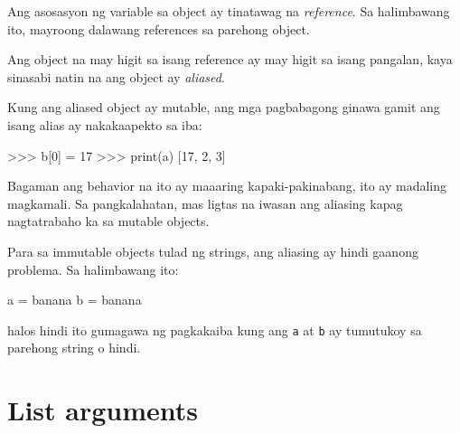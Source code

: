 \documentclass[10pt,]{book}
\newenvironment{Shaded}{}{}
\newcommand{\BuiltInTok}[1]{\textcolor[rgb]{0.00,0.50,0.00}{#1}}
\newcommand{\DecValTok}[1]{\textcolor[rgb]{0.25,0.63,0.44}{#1}}
\newcommand{\NormalTok}[1]{#1}
\newcommand{\OperatorTok}[1]{\textcolor[rgb]{0.40,0.40,0.40}{#1}}
\newcommand{\StringTok}[1]{\textcolor[rgb]{0.25,0.44,0.63}{#1}}
\begin{document}
Ang asosasyon ng variable sa object ay tinatawag na \emph{reference}. Sa
halimbawang ito, mayroong dalawang references sa parehong object.


Ang object na may higit sa isang reference ay may higit sa isang
pangalan, kaya sinasabi natin na ang object ay \emph{aliased}.


Kung ang aliased object ay mutable, ang mga pagbabagong ginawa gamit ang
isang alias ay nakakaapekto sa iba:

\begin{Shaded}
\begin{Highlighting}[]
\OperatorTok{\textgreater{}\textgreater{}\textgreater{}}\NormalTok{ b[}\DecValTok{0}\NormalTok{] }\OperatorTok{=} \DecValTok{17}
\OperatorTok{\textgreater{}\textgreater{}\textgreater{}} \BuiltInTok{print}\NormalTok{(a)}
\NormalTok{[}\DecValTok{17}\NormalTok{, }\DecValTok{2}\NormalTok{, }\DecValTok{3}\NormalTok{]}
\end{Highlighting}
\end{Shaded}

Bagaman ang behavior na ito ay maaaring kapaki-pakinabang, ito ay
madaling magkamali. Sa pangkalahatan, mas ligtas na iwasan ang aliasing
kapag nagtatrabaho ka sa mutable objects.


Para sa immutable objects tulad ng strings, ang aliasing ay hindi
gaanong problema. Sa halimbawang ito:

\begin{Shaded}
\begin{Highlighting}[]
\NormalTok{a }\OperatorTok{=} \StringTok{\textquotesingle{}banana\textquotesingle{}}
\NormalTok{b }\OperatorTok{=} \StringTok{\textquotesingle{}banana\textquotesingle{}}
\end{Highlighting}
\end{Shaded}

halos hindi ito gumagawa ng pagkakaiba kung ang \texttt{a} at \texttt{b}
ay tumutukoy sa parehong string o hindi.

\section{List arguments}\label{list-arguments}

  
 
\end{document}
